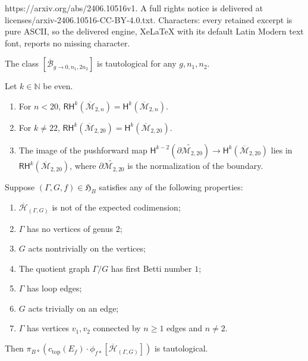 \documentclass[10pt,a4paper]{amsart}
\newcommand{\Bb}{\overline{\mathcal{B}}}
\newcommand{\Hb}{\overline{\mathcal{H}}}
\newcommand{\Mb}{\overline{\M}}
\newcommand{\M}{\mathcal{M}}
\newcommand{\RH}{\mathsf{RH}}
\renewcommand{\H}{\mathsf{H}}
\renewcommand{\tilde}{\widetilde}
\begin{document}
https://arxiv.org/abs/2406.10516v1. A full rights notice is delivered at licenses/arxiv-2406.10516-CC-BY-4.0.txt. Characters: every retained excerpt is pure ASCII, so the delivered engine, XeLaTeX with its default Latin Modern text font, reports no missing character.
\begin{thm}\label{hyperelliptictaut}
The class $[\Bb_{g\rightarrow 0, n_1,2n_2}]$ is tautological for any $g,n_1,n_2$.
\end{thm}

\begin{thm}\label{PetersenTommasi}
Let $k\in \mathbb{N}$ be even.
    \begin{enumerate}
        \item For $n<20$, $\RH^{k}(\Mb_{2,n})=\H^{k}(\Mb_{2,n})$.
        \item For $k\neq 22$, $\RH^{k}(\Mb_{2,20})=\H^{k}(\Mb_{2,20})$.
        \item The image of the pushforward map $\H^{k-2}(\tilde{\partial\M_{2,20}})\rightarrow \H^{k}(\Mb_{2,20})$ lies in $\RH^k(\Mb_{2,20})$, where $\tilde{\partial\M_{2,20}}$ is the normalization of the boundary.
    \end{enumerate}
\end{thm}

\begin{lem}\label{tautterms}
    Suppose $(\Gamma,G,f)\in \mathfrak{H}_B$ satisfies any of the following properties:

    \begin{enumerate}
        \item $\Hb_{(\Gamma,G)}$ is not of the expected codimension;
        \item $\Gamma$ has no vertices of genus $2$;
        \item $G$ acts nontrivially on the vertices;
        \item The quotient graph $\Gamma/G$ has first Betti number $1$;
        \item $\Gamma$ has loop edges;
        \item $G$ acts trivially on an edge;
        \item $\Gamma$ has vertices $v_1,v_2$ connected by $n\geq 1$ edges and $n\neq 2$.
    
    \end{enumerate}
Then $\pi_{B*}\left(c_{\mathrm{top}}(E_f)\cdot \phi_{f*}[\Hb_{(\Gamma,G)}]\right)$ is tautological.
\end{lem}
\end{document}
